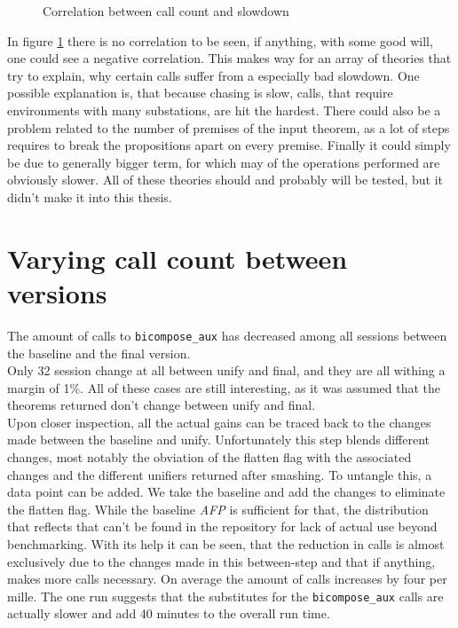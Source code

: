 \begin{figure}[ht]
\centering
\caption{Correlation between call count and slowdown}
\label{fig:correlation}
\end{figure}

In figure \ref{fig:correlation} there is no correlation to be seen, if anything, with some good will, one could see a negative correlation. This makes way for an array of theories that try to explain, why certain calls suffer from a especially bad slowdown. One possible explanation is, that because chasing is slow, calls, that require environments with many substations, are hit the hardest. There could also be a problem related to the number of premises of the input theorem, as a lot of steps requires to break the propositions apart on every premise. Finally it could simply be due to generally bigger term, for which may of the operations performed are obviously slower. All of these theories should and probably will be tested, but it didn't make it into this thesis.

\section{Varying call count between versions}

The amount of calls to \texttt{bicompose\_aux} has decreased among all sessions between the baseline and the final version.\\
Only 32 session change at all between unify and final, and they are all withing a margin of 1\%. All of these cases are still interesting, as it was assumed that the theorems returned don't change between unify and final.\\
Upon closer inspection, all the actual gains can be traced back to the changes made between the baseline and unify. Unfortunately this step blends different changes, most notably the obviation of the flatten flag with the associated changes and the different unifiers returned after smashing. To untangle this, a data point can be added. We take the baseline and add the changes to eliminate the flatten flag. While the baseline \textit{AFP} is sufficient for that, the distribution that reflects that can't be found in the repository for lack of actual use beyond benchmarking. With its help it can be seen, that the reduction in calls is almost exclusively due to the changes made in this between-step and that if anything, makes more calls necessary. On average the amount of calls increases by four per mille. The one run suggests that the substitutes for the \texttt{bicompose\_aux} calls are actually slower and add 40 minutes to the overall run time.